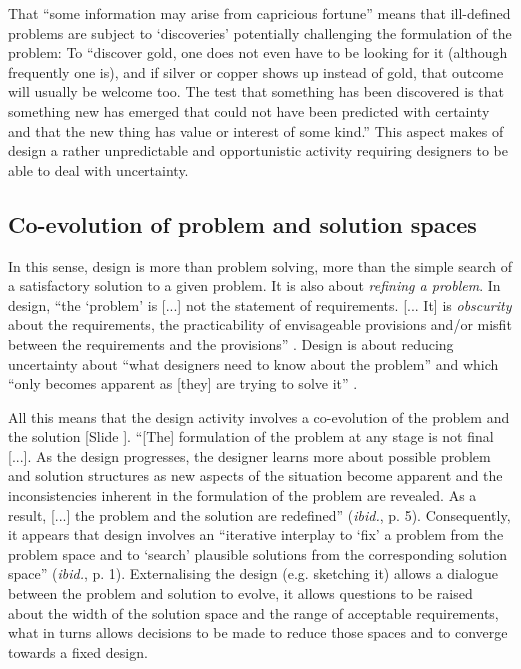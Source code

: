 \documentclass{article}
\newcounter{slide}
\begin{document}
That ``some information may arise from capricious fortune'' means that ill-defined problems are subject to `discoveries' potentially challenging the formulation of the problem: To ``discover gold, one does not even have to be looking for it (although frequently one is), and if silver or copper shows up instead of gold, that outcome will usually be welcome too. The test that something has been discovered is that something new has emerged that could not have been predicted with certainty and that the new thing has value or interest of some kind.'' This aspect makes of design a rather unpredictable and opportunistic activity requiring designers to be able to deal with uncertainty.

\subsection{Co-evolution of problem and solution spaces}
\label{sec:coevolution}
In this sense, design is more than problem solving, more than the simple search of a satisfactory solution to a given problem. It is also about \emph{refining a problem}. In design, ``the `problem' is [...] not the statement of requirements. [... It] is \emph{obscurity} about the requirements, the practicability of envisageable provisions and/or misfit between the requirements and the provisions'' \cite[emphasis is not in the original text]{archerDesignDiscipline1979}. Design is about reducing uncertainty about ``what designers need to know about the problem'' and which ``only becomes apparent as [they] are trying to solve it'' \cite{cross2011design}. 

All this means that the design activity involves a co-evolution of the problem and the solution \cite{maherFormalisingDesignExploration1996} {\color{blue}[Slide ]}. ``[The] formulation of the problem at any stage is not final [...]. As the design progresses, the designer learns more about possible problem and solution structures as new aspects of the situation become apparent and the inconsistencies inherent in the formulation of the problem are revealed. As a result, [...] the problem and the solution are redefined'' (\emph{ibid.}, p. 5). Consequently, it appears that design involves an ``iterative interplay to `fix' a problem from the problem space and to `search' plausible solutions from the corresponding solution space'' (\emph{ibid.}, p. 1). Externalising the design (e.g. sketching it) allows a dialogue between the problem and solution to evolve, it allows questions to be raised about the width of the solution space and the range of acceptable requirements, what in turns allows decisions to be made to reduce those spaces and to converge towards a fixed design. 
\end{document}
